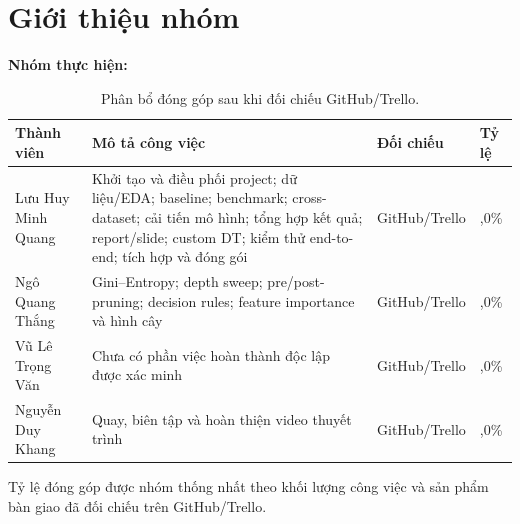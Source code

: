 \chapter*{Giới thiệu nhóm}

\noindent\textbf{Nhóm thực hiện:} \groupname

\begin{table}[H]
    \centering
    \scriptsize
    \caption*{Phân bổ đóng góp sau khi đối chiếu GitHub/Trello.}
    \begin{tabularx}{\textwidth}{@{}>{\raggedright\arraybackslash}p{}>{\raggedright\arraybackslash}X>{\centering\arraybackslash}p{}>{\centering\arraybackslash}p{}@{}}
        \toprule
        \textbf{Thành viên} & \textbf{Mô tả công việc} & \textbf{Đối chiếu} & \textbf{Tỷ lệ} \\
        \midrule
        Lưu Huy Minh Quang & Khởi tạo và điều phối project; dữ liệu/EDA; baseline; benchmark; cross-dataset; cải tiến mô hình; tổng hợp kết quả; report/slide; custom DT; kiểm thử end-to-end; tích hợp và đóng gói & GitHub/Trello & 80,0\% \\
        Ngô Quang Thắng & Gini--Entropy; depth sweep; pre/post-pruning; decision rules; feature importance và hình cây & GitHub/Trello & 10,0\% \\
        Vũ Lê Trọng Văn & Chưa có phần việc hoàn thành độc lập được xác minh & GitHub/Trello & 0,0\% \\
        Nguyễn Duy Khang & Quay, biên tập và hoàn thiện video thuyết trình & GitHub/Trello & 10,0\% \\
        \bottomrule
    \end{tabularx}
\end{table}

Tỷ lệ đóng góp được nhóm thống nhất theo khối lượng công việc và sản phẩm bàn giao đã đối chiếu trên GitHub/Trello.

\clearpage

